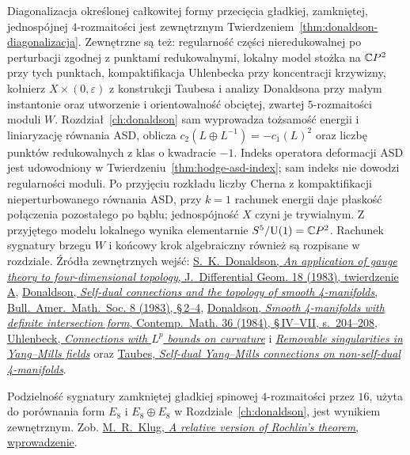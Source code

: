 \begin{description}[leftmargin=2.9cm,style=nextline]
\item[Twierdzenie Donaldsona i analiza równań ASD.]
  Diagonalizacja określonej całkowitej formy przecięcia
  gładkiej, zamkniętej, jednospójnej $4$-rozmaitości
  jest zewnętrznym Twierdzeniem~\ref{thm:donaldson-diagonalizacja}.
  Zewnętrzne są też: regularność części nieredukowalnej
  po perturbacji zgodnej z punktami redukowalnymi,
  lokalny model stożka na $\mathbb{C} P^2$ przy tych punktach,
  kompaktifikacja Uhlenbecka przy koncentracji krzywizny,
  kołnierz $X\times(0,\varepsilon)$ z konstrukcji Taubesa
  i analizy Donaldsona przy małym instantonie oraz
  utworzenie i orientowalność obciętej, zwartej
  $5$-rozmaitości moduli $W$.
  Rozdział~\ref{ch:donaldson} sam wyprowadza tożsamość
  energii i liniaryzację równania ASD, oblicza
  $c_2(L\oplus L^{-1})=-c_1(L)^2$ oraz liczbę punktów
  redukowalnych z klas o kwadracie $-1$.
  Indeks operatora deformacji ASD jest udowodniony
  w Twierdzeniu~\ref{thm:hodge-asd-index}; sam indeks
  nie dowodzi regularności moduli.
  Po przyjęciu rozkładu liczby Cherna z kompaktifikacji
  nieperturbowanego równania ASD, przy $k=1$ rachunek
  energii daje płaskość połączenia pozostałego po bąblu;
  jednospójność $X$ czyni je trywialnym. Z przyjętego modelu lokalnego
  wynika elementarnie $S^5/\mathrm{U}(1)=\mathbb{C} P^2$.
  Rachunek sygnatury brzegu $W$ i końcowy krok
  algebraiczny również są rozpisane w rozdziale.
  Źródła zewnętrznych wejść:
  \href{https://doi.org/10.4310/jdg/1214437665}
  {S.~K.~Donaldson, \emph{An application of gauge theory
  to four-dimensional topology}, J.~Differential Geom. 18
  (1983), twierdzenie A},
  \href{https://doi.org/10.1090/S0273-0979-1983-15090-5}
  {Donaldson, \emph{Self-dual connections and the topology
  of smooth 4-manifolds}, Bull.~Amer.~Math.~Soc. 8
  (1983), \S\,2--4},
  \href{https://math.berkeley.edu/~kirby/papers/Gordon%20and%20Kirby%20%28editors%29%20-%20Four-manifold%20theory%20%28Durham%29%20-%20MR0780574.pdf}
  {Donaldson, \emph{Smooth 4-manifolds with definite
  intersection form}, Contemp.~Math. 36 (1984),
  \S\,IV--VII, s.~204--208},
  \href{https://doi.org/10.1007/BF01947069}
  {Uhlenbeck, \emph{Connections with $L^p$ bounds on curvature}}
  i \href{https://doi.org/10.1007/BF01947068}
  {\emph{Removable singularities in Yang--Mills fields}}
  oraz \href{https://doi.org/10.4310/jdg/1214436701}
  {Taubes, \emph{Self-dual Yang--Mills connections
  on non-self-dual 4-manifolds}}.

\item[Twierdzenie Rokhlina.]
  Podzielność sygnatury zamkniętej gładkiej
  spinowej $4$-rozmaitości przez $16$, użyta do
  porównania form $E_8$ i $E_8\oplus E_8$ w
  Rozdziale~\ref{ch:donaldson}, jest wynikiem
  zewnętrznym. Zob.
  \href{https://arxiv.org/pdf/2011.12418}
  {M.~R.~Klug, \emph{A relative version of Rochlin's
  theorem}, wprowadzenie}.


\end{description}
